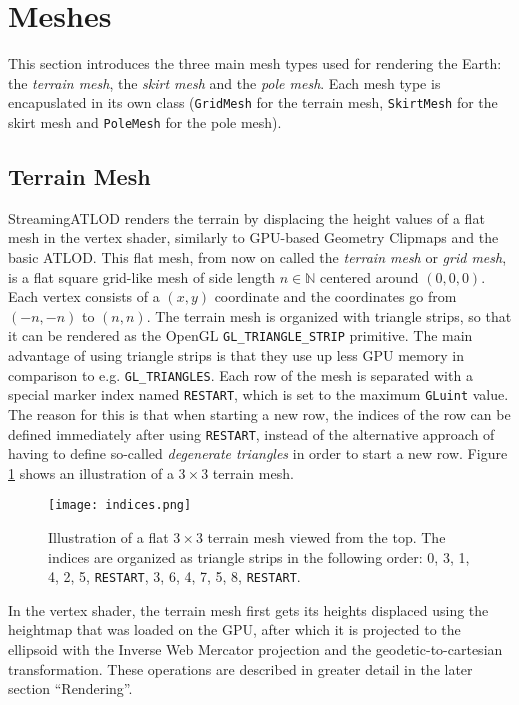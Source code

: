 \section{Meshes}
This section introduces the three main mesh types used for rendering the Earth: the \textit{terrain mesh},
the \textit{skirt mesh} and the \textit{pole mesh}. Each mesh type 
is encapuslated in its own class (\texttt{GridMesh} for the terrain mesh, \texttt{SkirtMesh} for the skirt mesh 
and \texttt{PoleMesh} for the pole mesh).

\subsection{Terrain Mesh}
StreamingATLOD renders the terrain by displacing the height values of a flat mesh in the vertex shader, 
similarly to GPU-based Geometry Clipmaps \cite{gpugeomclipmaps} and the basic ATLOD\cite{p2}.
This flat mesh, from now on called the \textit{terrain mesh} or \textit{grid mesh},
is a flat square grid-like mesh of side length $n \in \mathbb{N}$ centered around $(0,0,0)$.
Each vertex consists of a $(x,y)$ coordinate and the coordinates go from $(-n,-n)$ to $(n,n)$.
The terrain mesh is organized with triangle strips, so that it can be rendered as the OpenGL \texttt{GL\_TRIANGLE\_STRIP} primitive.
The main advantage of using triangle strips is that they use up less GPU memory in comparison to e.g. \texttt{GL\_TRIANGLES}.
Each row of the mesh is separated with a special marker index named \texttt{RESTART}, which is set 
to the maximum \texttt{GLuint} value. The reason for this is that when starting a new row, 
the indices of the row can be defined immediately after using \texttt{RESTART}, instead of 
the alternative approach of having to 
define so-called \textit{degenerate triangles} in order to start a new row.
Figure \ref{fig:indices} shows an illustration of a $3 \times 3$ terrain mesh.

\begin{figure}[H]
  \centering
  \texttt{[image: indices.png]}
  \caption{Illustration of a flat $3 \times 3$ terrain mesh viewed from the top. The indices are organized as triangle strips in the following order: 0, 3, 1, 4, 2, 5, \texttt{RESTART}, 3, 6, 4, 7, 5, 8, \texttt{RESTART}.}\label{fig:indices}
\end{figure}

In the vertex shader, the terrain mesh first gets its heights displaced using the heightmap that was loaded on the GPU,
after which it is projected to the ellipsoid with the Inverse Web Mercator projection and the geodetic-to-cartesian transformation.
These operations are described in greater detail in the later section ``Rendering''.


